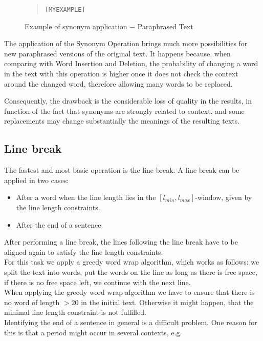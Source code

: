 \documentclass{reportAlternative}
\begin{document}
\begin{figure}[H]
\begin{quote}
\begin{alltt}
[MY EXAMPLE]
\end{alltt}
\end{quote}
\caption{Example of synonym application $-$ Paraphrased Text}
\end{figure}

The application of the Synonym Operation brings much more possibilities for new paraphrased versions of the original text. It happens because, when comparing with Word Insertion and Deletion, the probability of changing a word in the text with this operation is higher once it does not check the context around the changed word, therefore allowing many words to be replaced.

Consequently, the drawback is the considerable loss of quality in the results, in function of the fact that synonyms are strongly related to context, and some replacements may change substantially the meanings of the resulting texts.

\subsection{Line break}
The fastest and most basic operation is the line break. A line break can be applied in two cases:

\begin{itemize}
	\item After a word when the line length lies in the $[l_{min},l_{max}]$-window,
	given by the line length constraints.
	\item After the end of a sentence.
\end{itemize}
After performing a line break, the lines following the line break have
to be aligned again to satisfy the line length constraints.\\
For this task we apply a greedy word wrap algorithm, which works as follows: we split the text into words,
put the words on the line as long as there is free space, if there is no free space left, we continue with the next line.\\
When applying the greedy word wrap algorithm we have to ensure that
there is no word of length $> 20$ in the initial text. Otherwise it might happen, that the minimal line
length constraint is not fulfilled.\\
Identifying the end of a sentence in general is a difficult problem. One reason for this is that a period
might occur in several contexts, e.g.
\end{document}
